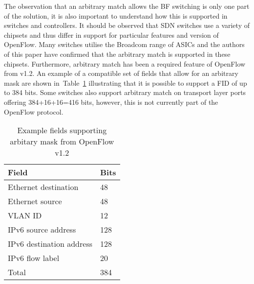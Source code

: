 \documentclass[conference]{IEEEtran}
\newcommand{\tabref}[1]{Table~\ref{#1}}
\begin{document}
The observation that an arbitrary match allows the BF switching is only one part of the solution, it is also important to understand how this is supported in switches and controllers. It should be observed that SDN switches use a variety of chipsets and thus differ in support for particular features and version of OpenFlow. Many switches utilise the Broadcom range of ASICs and the authors of this paper have confirmed that the arbitrary match is supported in these chipsets. Furthermore, arbitrary match has been a required feature of OpenFlow from v1.2. An example of a compatible set of fields that allow for an arbitrary mask are shown in~\tabref{tab:arbitary} illustrating that it is possible to support a FID of up to 384 bits. Some switches also support arbitrary match on transport layer ports offering 384+16+16=416 bits, however, this is not currently part of the OpenFlow protocol.
\begin{table}[tb]
  \centering
  \caption{Example fields supporting arbitary mask from OpenFlow v1.2}
  \vspace{0.5em}
  \begin{tabular}{|l|l|}
    \hline
    Field & Bits\\
    \hline
    Ethernet destination & 48 \\
    Ethernet source & 48 \\
    VLAN ID & 12 \\
    IPv6 source address & 128 \\
    IPv6 destination address & 128 \\
    IPv6 flow label & 20 \\
    \hline
    Total & 384 \\
    \hline
  \end{tabular}
  \label{tab:arbitary}
\end{table}
\end{document}

